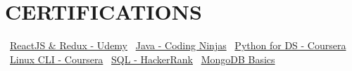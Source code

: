 \documentclass[letterpaper,11pt]{article}
\newcommand\sbullet[1][.5]{\mathbin{\vcenter{\hbox{\scalebox{#1}{$\bullet$}}}}}
\begin{document}
\section{CERTIFICATIONS}
\sbullet[.75]~{\href{https://certificate.com}{ReactJS \& Redux - Udemy}} \hspace{1.5cm}
\sbullet[.75]~{\href{https://certificate.com}{Java - Coding Ninjas}} \hspace{2cm}
\sbullet[.75]~{\href{https://certificate.com}{Python for DS - Coursera}} \\

\sbullet[.75]~{\href{https://certificate.com}{Linux CLI - Coursera}} \hspace{2cm}
\sbullet[.75]~{\href{https://certificate.com}{SQL - HackerRank}} \hspace{2.5cm}
\sbullet[.75]~{\href{https://certificate.com}{MongoDB Basics}} \\
\end{document}
